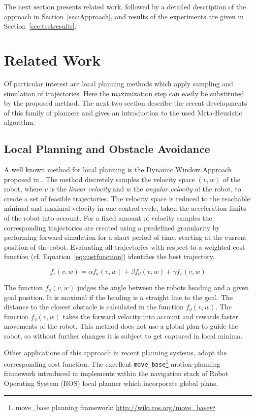 The next section presents related work, followed by a detailed description of the approach in Section~\ref{sec:Approach}, and results of the experiments are given in Section~\ref{sec:testresults}. 
\section{Related Work} \label{sec:RelatedWork}
Of particular interest are local planning methods which apply sampling and simulation of trajectories. 
Here the maximization step can easily be substituted by the proposed method. The next two section describe the recent developments of this family of planners and gives an introduction to the used Meta-Heuristic algorithm.

\subsection{Local Planning and Obstacle Avoidance}
A well known method for local planning is the Dynamic Window Approach proposed in \cite{DWA1997}. 
The method discretely samples the velocity space $(v,w)$ of the robot, where $v$ is the \emph{linear velocity} and $w$ the \emph{angular velocity} of the robot, to create a set of feasible trajectories.
The velocity space is reduced to the reachable minimal and maximal velocity in one control cycle, taken the acceleration limits of the robot into account.
For a fixed amount of velocity samples the corresponding trajectories are created using a predefined granularity by performing forward simulation for a short period of time, starting at the current position of the robot. Evaluating all trajectories with respect to a weighted cost function (cf. Equation~\ref{eq:costfunction}) identifies the best trajectory.

\begin{equation}
   f_c(v,w)=\alpha f_a(v,w)+\beta f_d(v,w)+\gamma f_v(v,w)
   \label{eq:costfunction}
\end{equation}

The function $f_a(v,w)$ judges the angle between the robots heading and a given goal position.
It is maximal if the heading is a straight line to the goal.
The distance to the closest obstacle is calculated in the function $f_d(v,w)$.
The function $f_v(v,w)$ takes the forward velocity into account and rewards faster movements of the robot.
This method does not use a global plan to guide the robot, so without further changes it is subject to get captured in local minima.

Other applications of this approach in recent planning systems, adapt the corresponding cost function. 
The excellent \texttt{move\_base}\footnote{move\_base planning framework: \url{http://wiki.ros.org/move_base}} motion-planning framework introduced in \cite{DBLP:conf/icra/Marder-EppsteinBFGK10} implements within the navigation stack of Robot Operating System (ROS) local planner which incorporate global plans.

